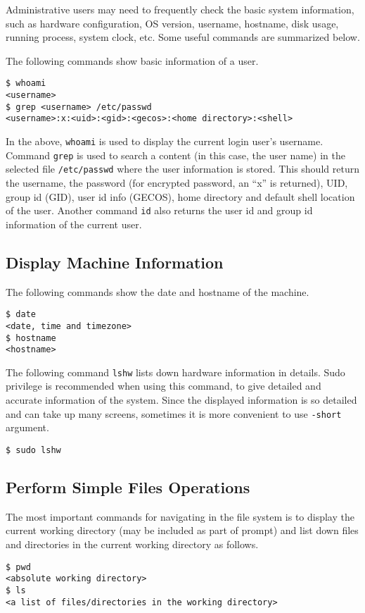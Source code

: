 Administrative users may need to frequently check the basic system information, such as hardware configuration, OS version, username, hostname, disk usage, running process, system clock, etc. Some useful commands are summarized below.

The following commands show basic information of a user.
\begin{lstlisting}
$ whoami
<username>
$ grep <username> /etc/passwd
<username>:x:<uid>:<gid>:<gecos>:<home directory>:<shell>
\end{lstlisting}
In the above, \verb|whoami| is used to display the current login user's username. Command \verb|grep| is used to search a content (in this case, the user name) in the selected file \verb|/etc/passwd| where the user information is stored. This should return the username, the password (for encrypted password, an ``x'' is returned), UID, group id (GID), user id info (GECOS), home directory and default shell location of the user.
Another command \verb|id| also returns the user id and group id information of the current user.

\subsection{Display Machine Information}

The following commands show the date and hostname of the machine.
\begin{lstlisting}
$ date
<date, time and timezone>
$ hostname
<hostname>
\end{lstlisting}

The following command \verb|lshw| lists down hardware information in details. Sudo privilege is recommended when using this command, to give detailed and accurate information of the system. Since the displayed information is so detailed and can take up many screens, sometimes it is more convenient to use \verb|-short| argument.
\begin{lstlisting}
$ sudo lshw
\end{lstlisting}

\subsection{Perform Simple Files Operations}

The most important commands for navigating in the file system is to display the current working directory (may be included as part of prompt) and list down files and directories in the current working directory as follows.
\begin{lstlisting}
$ pwd
<absolute working directory>
$ ls
<a list of files/directories in the working directory>
\end{lstlisting}

